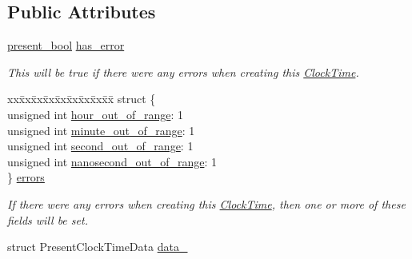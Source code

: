 \subsection*{Public Attributes}
\begin{DoxyCompactItemize}
\item 
\hyperlink{types_8h_a1c24e2cdd988b886e889080ded176ae0}{present\-\_\-bool} \hyperlink{structClockTime_ab04bad96a5d91e8a29b61a1802e5faba}{has\-\_\-error}
\begin{DoxyCompactList}\small\item\em This will be true if there were any errors when creating this \hyperlink{structClockTime}{Clock\-Time}. \end{DoxyCompactList}\item 
\begin{tabbing}
xx\=xx\=xx\=xx\=xx\=xx\=xx\=xx\=xx\=\kill
struct \{\\
\>unsigned int \hyperlink{structClockTime_ae1b535b4a771fa99feb0ca7e4d39d452}{hour\_out\_of\_range}: 1\\
\>unsigned int \hyperlink{structClockTime_a3cbd954dccf7539e4a03293e19bcfe2c}{minute\_out\_of\_range}: 1\\
\>unsigned int \hyperlink{structClockTime_a3dd3292426da0f8b633cffcb24a26069}{second\_out\_of\_range}: 1\\
\>unsigned int \hyperlink{structClockTime_ac7051869fd450e25f77b7fd3c807bb8f}{nanosecond\_out\_of\_range}: 1\\
\} \hyperlink{structClockTime_a7aa79d494a580c4961d5e0f0c2e112a0}{errors}\\

\end{tabbing}\begin{DoxyCompactList}\small\item\em If there were any errors when creating this \hyperlink{structClockTime}{Clock\-Time}, then one or more of these fields will be set. \end{DoxyCompactList}\item 
struct Present\-Clock\-Time\-Data \hyperlink{structClockTime_a3fe115dffef3ba153e1fff6e0b2c0a23}{data\-\_\-}
\end{DoxyCompactItemize}
